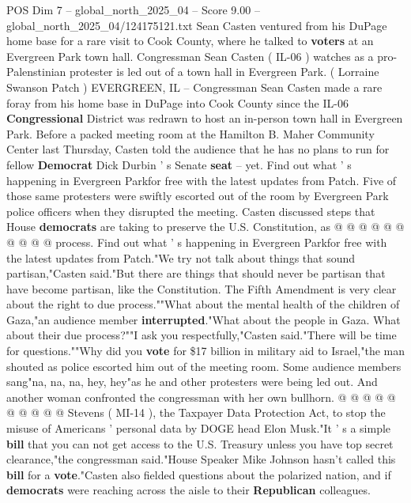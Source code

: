 \begin{textsample}{POS Dim 7 – global\_north\_2025\_04 – Score 9.00 – global\_north\_2025\_04/124175121.txt}  \label{ex:f7_pos_359}
Sean Casten ventured from his DuPage home base for a rare visit to Cook County, where he talked to \textbf{voters} at an Evergreen Park town hall.
Congressman Sean Casten ( IL-06 ) watches as a pro-Palenstinian protester is led out of a town hall in Evergreen Park. ( Lorraine Swanson Patch ) EVERGREEN, IL -- Congressman Sean Casten made a rare foray from his home base in DuPage into Cook County since the IL-06 \textbf{Congressional} District was redrawn to host an in-person town hall in Evergreen Park.
Before a packed meeting room at the Hamilton B.
Maher Community Center last Thursday, Casten told the audience that he has no plans to run for fellow \textbf{Democrat} Dick Durbin ' s Senate \textbf{seat} -- yet.
Find out what ' s happening in Evergreen Parkfor free with the latest updates from Patch.
Five of those same protesters were swiftly escorted out of the room by Evergreen Park police officers when they disrupted the meeting.
Casten discussed steps that House \textbf{democrats} are taking to preserve the U.S.
Constitution, as @ @ @ @ @ @ @ @ @ @ process.
Find out what ' s happening in Evergreen Parkfor free with the latest updates from Patch."We try not talk about things that sound partisan,"Casten said."But there are things that should never be partisan that have become partisan, like the Constitution.
The Fifth Amendment is very clear about the right to due process.""What about the mental health of the children of Gaza,"an audience member \textbf{interrupted}."What about the people in Gaza.
What about their due process?""I ask you respectfully,"Casten said."There will be time for questions.""Why did you \textbf{vote} for \$17 billion in military aid to Israel,"the man shouted as police escorted him out of the meeting room.
Some audience members sang"na, na, na, hey, hey"as he and other protesters were being led out.
And another woman confronted the congressman with her own bullhorn. @ @ @ @ @ @ @ @ @ @ Stevens ( MI-14 ), the Taxpayer Data Protection Act, to stop the misuse of Americans ' personal data by DOGE head Elon Musk."It ' s a simple \textbf{bill} that you can not get access to the U.S.
Treasury unless you have top secret clearance,"the congressman said."House Speaker Mike Johnson hasn't called this \textbf{bill} for a \textbf{vote}."Casten also fielded questions about the polarized nation, and if \textbf{democrats} were reaching across the aisle to their \textbf{Republican} colleagues.

\end{textsample}
